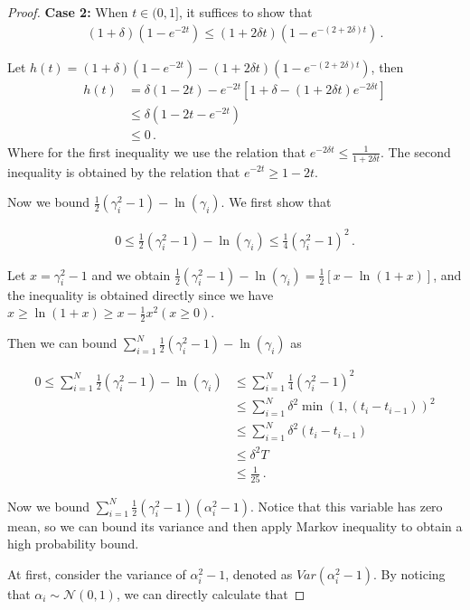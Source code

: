 \documentclass{article}
\theoremstyle{definition}
\begin{document}
\begin{proof}
\textbf{Case 2:} When $t\in(0,1]$, it suffices to show that
\begin{align*}
(1+\delta)(1-e^{-2t})\leq (1+2\delta t)(1-e^{-(2+2\delta)t})\,.
\end{align*}

Let $h(t)=(1+\delta)(1-e^{-2t})-(1+2\delta t)(1-e^{-(2+2\delta)t})$, then
\begin{align*}
h(t)&=\delta(1-2t)-e^{-2t}[1+\delta -(1+2\delta t)e^{-2\delta t}]\\
&\leq \delta(1-2t-e^{-2t})\\
&\leq 0\,.
\end{align*}
Where for the first inequality we use the relation that $e^{-2\delta t}\leq \frac{1}{1+2\delta t}$. The second inequality is obtained by the relation that $e^{-2t}\geq 1-2t$.

Now we bound $\frac{1}{2}(\gamma^{2}_{i}-1)-\ln(\gamma_{i})$. We first show that

\begin{align*}
0\leq \frac{1}{2}(\gamma^{2}_{i}-1)-\ln(\gamma_{i})\leq \frac{1}{4}(\gamma^{2}_{i}-1)^{2}\,.
\end{align*}

Let $x=\gamma^{2}_{i}-1$ and we obtain $ \frac{1}{2}(\gamma^{2}_{i}-1)-\ln(\gamma_{i})=\frac{1}{2}[x-\ln(1+x)]$, and the inequality is obtained directly since we have $x\geq \ln(1+x)\geq x-\frac{1}{2}x^{2}(x\geq 0)$.

Then we can bound $\sum_{i=1}^{N}\frac{1}{2}(\gamma^{2}_{i}-1)-\ln(\gamma_{i})$ as

\begin{align*}
0\leq \sum_{i=1}^{N}\frac{1}{2}(\gamma^{2}_{i}-1)-\ln(\gamma_{i})&\leq \sum_{i=1}^{N}\frac{1}{4}(\gamma^{2}_{i}-1)^{2}\\
&\leq \sum_{i=1}^{N}\delta^{2}\min(1,(t_{i}-t_{i-1}))^{2}\\
&\leq \sum_{i=1}^{N}\delta^{2}(t_{i}-t_{i-1})\\
&\leq \delta^{2}T\\&\leq \frac{1}{25}\,.
\end{align*}

Now we bound $\sum_{i=1}^{N}\frac{1}{2}(\gamma^{2}_{i}-1)(\alpha^{2}_{i}-1)$. Notice that this variable has zero mean, so we can bound its variance and then apply Markov inequality to obtain a high probability bound.

At first, consider the variance of $\alpha_{i}^{2}-1$, denoted as $Var(\alpha_{i}^{2}-1)$. By noticing that $\alpha_{i}\sim\mathcal{N}(0,1)$, we can directly calculate that


\end{proof}
\end{document}

